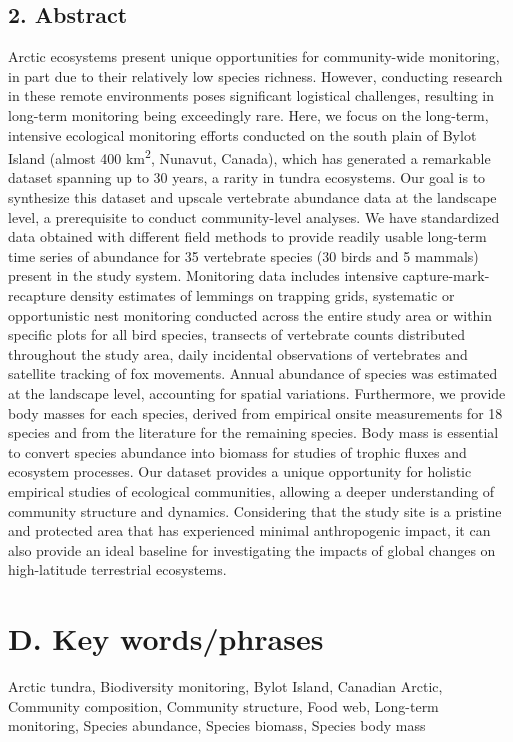 \documentclass[a4paper,twoside,12pt]{article}
\begin{document}
                \subsection*{2. Abstract}
Arctic ecosystems present unique opportunities for community-wide monitoring, in part due to their relatively low species richness. However, conducting research in these remote environments poses significant logistical challenges, resulting in long-term monitoring being exceedingly rare. Here, we focus on the long-term, intensive ecological monitoring efforts conducted on the south plain of Bylot Island (almost 400 km\textsuperscript{2}, Nunavut, Canada), which has generated a remarkable dataset spanning up to 30 years, a rarity in tundra ecosystems. Our goal is to synthesize this dataset and upscale vertebrate abundance data at the landscape level, a prerequisite to conduct community-level analyses. We have standardized data obtained with different field methods to provide readily usable long-term time series of abundance for 35 vertebrate species (30 birds and 5 mammals) present in the study system. Monitoring data includes intensive capture-mark-recapture density estimates of lemmings on trapping grids, systematic or opportunistic nest monitoring conducted across the entire study area or within specific plots for all bird species, transects of vertebrate counts distributed throughout the study area, daily incidental observations of vertebrates and satellite tracking of fox movements. Annual abundance of species was estimated at the landscape level, accounting for spatial variations. Furthermore, we provide body masses for each species, derived from empirical onsite measurements for 18 species and from the literature for the remaining species. Body mass is essential to convert species abundance into biomass for studies of trophic fluxes and ecosystem processes. Our dataset provides a unique opportunity for holistic empirical studies of ecological communities, allowing a deeper understanding of community structure and dynamics. Considering that the study site is a pristine and protected area that has experienced minimal anthropogenic impact, it can also provide an ideal baseline for investigating the impacts of global changes on high-latitude terrestrial ecosystems.
   \section*{D. Key words/phrases}
Arctic tundra, Biodiversity monitoring,  Bylot Island, Canadian Arctic, Community composition, Community structure, Food web, Long-term monitoring, Species abundance, Species biomass, Species body mass
\end{document}
